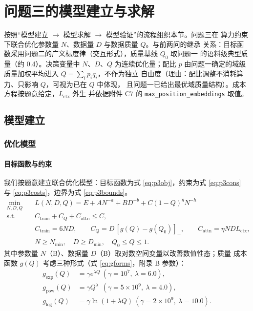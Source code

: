 \section{问题三的模型建立与求解}

按照``模型建立 $\to$ 模型求解 $\to$ 模型验证''的流程组织本节。问题三在
算力约束下联合优化参数量 $N$、数据量 $D$ 与数据质量 $Q$。与前两问的继承
关系：目标函数采用问题二的广义标度律（交互形式），质量基线 $Q_0$ 取问题一
的语料级典型质量（约 0.4）。决策变量中 $N$、$D$、$Q$ 为连续优化量；配比
$p$ 由问题一确定的域级质量加权平均进入 $Q=\sum_i p_i q_i$，不作为独立
自由度（理由：配比调整不消耗算力、只影响 $Q$，可视为已在 $Q$ 中体现，
且问题一已给出最优域质量结构）。成本方程按题意给定，$L_{\text{ctx}}$ 外生
并依据附件 C7 的 \texttt{max\_position\_embeddings} 取值。

\subsection{模型建立}

\subsubsection{优化模型}

\paragraph{目标函数与约束}

我们按题意建立联合优化模型：目标函数为式 \ref{eq:p3obj}，约束为式
\ref{eq:p3cons} 与 \ref{eq:p3costs}，边界为式 \ref{eq:p3bounds}。
\begin{align}
\min_{N,D,Q}\quad & L(N,D,Q)=E+A N^{-a}+B D^{-b}+C(1-Q)^{g}N^{-h}
\label{eq:p3obj}\\
\text{s.t.}\quad & C_{\text{train}}+C_Q+C_{\text{attn}}\le C,
\label{eq:p3cons}\\
& C_{\text{train}}=6ND,\qquad
C_Q=D\,[g(Q)-g(Q_0)]_+,\qquad
C_{\text{attn}}=\eta N D L_{\text{ctx}},
\label{eq:p3costs}\\
& N\ge N_{\min},\quad D\ge D_{\min},\quad Q_0\le Q\le 1.
\label{eq:p3bounds}
\end{align}
其中参数量 $N$（B）、数据量 $D$（B）取对数空间变量以改善数值性态；质量
成本函数 $g(Q)$ 考虑三种形式（式 \ref{eq:gforms}，附录 B 参数）：
\begin{align}
g_{\text{exp}}(Q)&=\gamma e^{\lambda Q}\ (\gamma{=}10^7,\ \lambda{=}6.0),\nonumber\\
g_{\text{pow}}(Q)&=\gamma Q^{\lambda}\ \ (\gamma{=}5\times10^9,\ \lambda{=}4.0),\nonumber\\
g_{\log}(Q)&=\gamma\ln(1+\lambda Q)\ (\gamma{=}2\times10^9,\ \lambda{=}10.0).
\label{eq:gforms}
\end{align}

